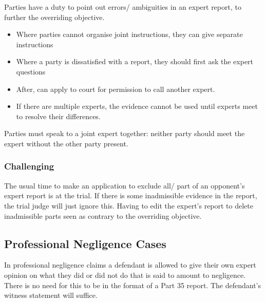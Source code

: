\documentclass[
]{article}
\providecommand{\tightlist}{%
  \setlength{\itemsep}{0pt}\setlength{\parskip}{0pt}}
\begin{document}
Parties have a duty to point out errors/ ambiguities in an expert
report, to further the overriding objective.

\begin{itemize}
\tightlist
\item
  Where parties cannot organise joint instructions, they can give
  separate instructions
\item
  Where a party is dissatisfied with a report, they should first ask the
  expert questions
\item
  After, can apply to court for permission to call another expert.
\item
  If there are multiple experts, the evidence cannot be used until
  experts meet to resolve their differences.
\end{itemize}

Parties must speak to a joint expert together: neither party should meet
the expert without the other party present.

\hypertarget{challenging}{%
\subsubsection{Challenging}\label{challenging}}

The usual time to make an application to exclude all/ part of an
opponent's expert report is at the trial. If there is some inadmissible
evidence in the report, the trial judge will just ignore this. Having to
edit the expert's report to delete inadmissible parts seen as contrary
to the overriding objective.

\hypertarget{professional-negligence-cases}{%
\subsection{Professional Negligence
Cases}\label{professional-negligence-cases}}

In professional negligence claims a defendant is allowed to give their
own expert opinion on what they did or did not do that is said to amount
to negligence. There is no need for this to be in the format of a Part
35 report. The defendant's witness statement will suffice.
\end{document}
